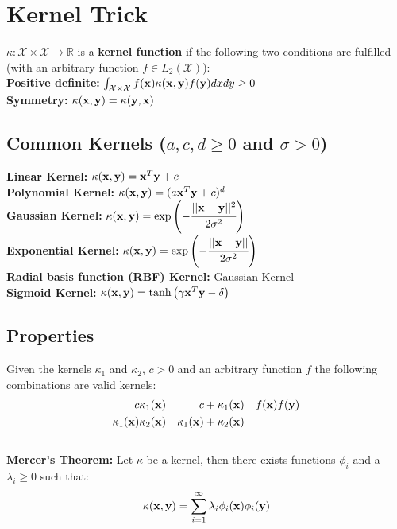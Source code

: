 \section{Kernel Trick}
\begin{mdframed}[style=eqbox]
$\kappa: \mathcal X \times \mathcal X \rightarrow \mathbb R$ is a \textbf{kernel function} if the following two conditions are fulfilled (with an arbitrary function $f \in L_2(\mathcal X)$):\\
\textbf{Positive definite:} $\int_{ \mathcal X \times \mathcal X} f(\mathbf{x}) \kappa(\mathbf{x}, \mathbf{y}) f( \mathbf{y}) dx dy \geq 0$\\
\textbf{Symmetry:}  $ \kappa(\mathbf{x}, \mathbf{y}) = \kappa(\mathbf{y}, \mathbf{x})$
\end{mdframed}
%
\begin{mdframed}[style=eqbox]
\subsection{Common Kernels (\(a, c, d \geq 0\) and \(\sigma > 0\))}
\textbf{Linear Kernel:} \(\kappa(\mathbf{x}, \mathbf{y}) = \mathbf{x}^T \mathbf{y} + c\)\\
\textbf{Polynomial Kernel:} \(\kappa(\mathbf{x}, \mathbf{y}) = (a \mathbf{x}^T \mathbf{y} + c)^d\)\\
\textbf{Gaussian Kernel:} \(\kappa(\mathbf{x}, \mathbf{y}) = \exp \left( -\cfrac{\vert\vert\mathbf{x} - \mathbf{y} \vert\vert^2}{2 \sigma^2} \right)\)\\
\textbf{Exponential Kernel:} \( \kappa(\mathbf{x}, \mathbf{y}) = \exp \left(- \cfrac{\vert\vert \mathbf{x} - \mathbf{y} \vert\vert}{2 \sigma^2} \right)\)\\
\textbf{Radial basis function (RBF) Kernel:} Gaussian Kernel\\
\textbf{Sigmoid Kernel:} \(\kappa(\mathbf{x}, \mathbf{y}) = \tanh \left(\gamma \mathbf{x}^T \mathbf{y} - \delta \right)\)
\end{mdframed}
%
\begin{mdframed}[style=eqbox]
\subsection{Properties}
Given the kernels $\kappa_1$ and $\kappa_2$, $c > 0$ and an arbitrary function $f$ the following combinations are valid kernels:
\vspace*{-8pt}\begin{align*}
  c \kappa_1(\mathbf{x}) && c + \kappa_1(\mathbf{x}) && f(\mathbf{x}) f(\mathbf{y})\\
  \kappa_1(\mathbf{x}) \kappa_2(\mathbf{x}) && \kappa_1(\mathbf{x}) + \kappa_2(\mathbf{x})
\end{align*}\vspace*{-16pt}\\
\textbf{Mercer's Theorem:}
Let $\kappa$ be a kernel, then there exists functions $\phi_i$ and a $\lambda_i \geq 0$ such that:
\vspace*{-8pt}\begin{align*}
\kappa(\mathbf{x}, \mathbf{y}) = \sum_{i=1}^{\infty} \lambda_i \phi_i(\mathbf{x}) \phi_i(\mathbf{y})
\end{align*}
\end{mdframed}